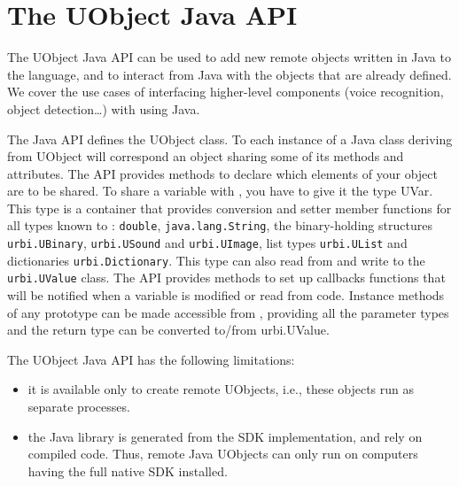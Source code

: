 
\newcommand{\indexJava}[1]{\index{#1@\lstinline{#1}!\Java}}

\chapter{The UObject Java API}
\label{sec:uob:apijava}

The UObject Java API can be used to add new remote objects written in Java
to the \us language, and to interact from Java with the objects that are
already defined. We cover the use cases of interfacing higher-level
components (voice recognition, object detection\ldots) with \urbi using
Java.

The Java API defines the UObject class. To each instance of a Java class
deriving from UObject will correspond an \us object sharing some of its
methods and attributes. The API provides methods to declare which elements
of your object are to be shared. To share a variable with \urbi, you have to
give it the type UVar. This type is a container that provides conversion and
setter member functions for all types known to \urbi: \lstinline{double},
\lstinline{java.lang.String}, the binary-holding structures
\lstinline{urbi.UBinary}, \lstinline{urbi.USound} and
\lstinline{urbi.UImage}, list types \lstinline{urbi.UList} and dictionaries
\lstinline{urbi.Dictionary}. This type can also read from and write to the
\lstinline{urbi.UValue} class. The API provides methods to set up callbacks
functions that will be notified when a variable is modified or read from \us
code. Instance methods of any prototype can be made accessible from \us,
providing all the parameter types and the return type can be converted
to/from urbi.UValue.

The UObject Java API has the following limitations:
\begin{itemize}
\item it is available only to create remote UObjects, i.e., these objects
  run as separate processes.
\item the Java library is generated from the \Cxx SDK implementation, and
  rely on compiled \Cxx code. Thus, remote Java UObjects can only run on
  computers having the full \urbi native SDK installed.
\end{itemize}


